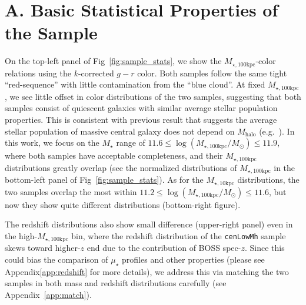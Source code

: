 \documentclass[a4paper,fleqn,usenatbib]{mnras}
\def\nbcg{\texttt{cenLowMh}}
\def\mstar{{$M_{\star}$}}
\def\mhalo{{$M_{\mathrm{halo}}$}}
\def\minn{{$M_{\star,10\mathrm{kpc}}$}}
\def\mtot{{$M_{\star,100\mathrm{kpc}}$}}
\def\logmtot{{$\log (M_{\star,100\mathrm{kpc}}/M_{\odot})$}}
\def\mden{{$\mu_{\star}$}}
\begin{document}




\clearpage

\clearpage


\appendix

\section{A. Basic Statistical Properties of the Sample} 
	\label{app:basic} 
    
    On the top-left panel of Fig~\ref{fig:sample_stats}, we show the \mtot{}-color 
    relations using the $k$-corrected $g-r$ color. 
    Both samples follow the same tight ``red-sequence'' with little contamination 
    from the ``blue cloud''.
    At fixed \mtot{}, we see little offset in color distributions of the two 
    samples, suggesting that both samples consist of quiescent galaxies with 
    similar average stellar population properties.  
    This is consistent with previous result that suggests the average stellar 
    population of massive central galaxy does not depend on \mhalo{} 
    (e.g.\ \citealt{Park2007}).  
    In this work, we focus on the \mstar{} range of $11.6 \le$\logmtot{}$\le 11.9$, 
    where both samples have acceptable completeness, and their \mtot{} distributions 
    greatly overlap (see the normalized distributions of \mtot{} in the bottom-left 
    panel of Fig~\ref{fig:sample_stats}). 
    As for the \minn{} distributions, the two samples overlap the most within 
    $11.2 \le$\logmtot{}$\le 11.6$, but now they show quite different
    distributions (bottom-right figure).
    
    The redshift distributions also show small difference
    (upper-right panel) even in the high-\mtot{} bin, where the redshift distribution 
    of the \nbcg{} sample skews toward higher-$z$ end due to the contribution of BOSS 
    spec-$z$.
    Since this could bias the comparison of \mden{} profiles and other properties 
    (please see Appendix\ref{app:redshift} for more details), we address this via matching 
    the two samples in both mass and redshift distributions carefully
    (see Appendix~\ref{app:match}).
    
\end{document}
